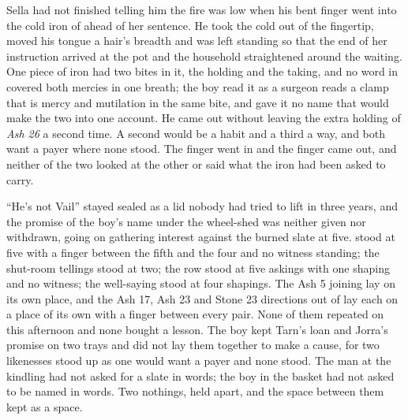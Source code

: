 Sella had not finished telling him the fire was low when his bent finger went into the cold iron of  ahead of her sentence. He took the cold out of the fingertip, moved his tongue a hair's breadth and was left standing so that the end of her instruction arrived at the pot and the household straightened around the waiting. One piece of iron had two bites in it, the holding and the taking, and no word in  covered both mercies in one breath; the boy read it as a surgeon reads a clamp that is mercy and mutilation in the same bite, and gave it no name that would make the two into one account. He came out without leaving the extra holding of \emph{Ash 26} a second time. A second would be a habit and a third a way, and both want a payer where none stood. The finger went in and the finger came out, and neither of the two looked at the other or said what the iron had been asked to carry.

“He's not Vail” stayed sealed as a lid nobody had tried to lift in three years, and the promise of the boy's name under the wheel-shed was neither given nor withdrawn, going on gathering interest against the burned slate at five.  stood at five with a finger between the fifth and the four and no witness standing; the shut-room tellings stood at two; the row stood at five askings with one shaping and no witness; the well-saying stood at four shapings. The Ash 5 joining lay on its own place, and the Ash 17, Ash 23 and Stone 23 directions out of  lay each on a place of its own with a finger between every pair. None of them repeated on this afternoon and none bought a lesson. The boy kept Tarn's loan and Jorra's promise on two trays and did not lay them together to make a cause, for two likenesses stood up as one would want a payer and none stood. The man at the kindling had not asked for a slate in words; the boy in the basket had not asked to be named in words. Two nothings, held apart, and the space between them kept as a space.

\scenebreak


